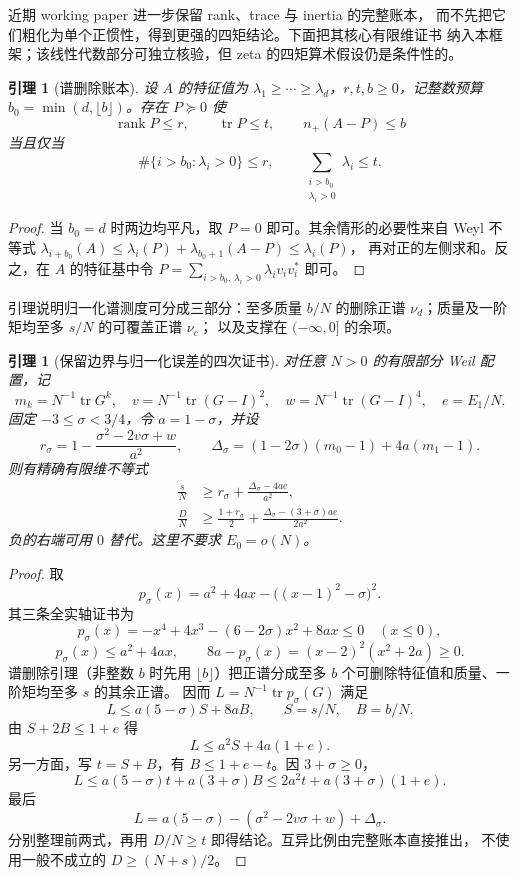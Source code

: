 \documentclass[UTF8,11pt,a4paper]{ctexart}
\newtheorem{lemma}[theorem]{引理}
\theoremstyle{definition}
\theoremstyle{remark}
\newcommand{\tr}{\operatorname{tr}}
\newcommand{\rank}{\operatorname{rank}}
\begin{document}
近期 working paper \cite{Notik26} 进一步保留 rank、trace 与 inertia 的完整账本，
而不先把它们粗化为单个正惯性，得到更强的四矩结论。下面把其核心有限维证书
纳入本框架；该线性代数部分可独立核验，但 zeta 的四矩算术假设仍是条件性的。

\begin{lemma}[谱删除账本]\label{lem:deletion}
设 $A$ 的特征值为 $\lambda_1\ge\cdots\ge\lambda_d$，$r,t,b\ge0$，记整数预算 $b_0=\min(d,\lfloor b\rfloor)$。存在
$P\succeq0$ 使
\[
 \rank P\le r,\qquad \tr P\le t,\qquad n_+(A-P)\le b
\]
当且仅当
\[
 \#\{i>b_0:\lambda_i>0\}\le r,\qquad
 \sum_{\substack{i>b_0\\\lambda_i>0}}\lambda_i\le t.
\]
\end{lemma}

\begin{proof}
当 $b_0=d$ 时两边均平凡，取 $P=0$ 即可。其余情形的必要性来自 Weyl 不等式
$\lambda_{i+b_0}(A)\le\lambda_i(P)+\lambda_{b_0+1}(A-P)\le\lambda_i(P)$，
再对正的左侧求和。反之，在 $A$ 的特征基中令
$P=\sum_{i>b_0,\,\lambda_i>0}\lambda_i v_iv_i^*$ 即可。
\end{proof}

引理说明归一化谱测度可分成三部分：至多质量 $b/N$ 的删除正谱
$\nu_d$；质量及一阶矩均至多 $s/N$ 的可覆盖正谱 $\nu_c$；
以及支撑在 $(-\infty,0]$ 的余项。

\begin{lemma}[保留边界与归一化误差的四次证书]\label{lem:quartic-finite}
对任意 $N>0$ 的有限部分 Weil 配置，记
\[
 m_k=N^{-1}\tr G^k,\quad
 v=N^{-1}\tr(G-I)^2,\quad w=N^{-1}\tr(G-I)^4,\quad
 e=E_1/N .
\]
固定 $-3\le\sigma<3/4$，令 $a=1-\sigma$，并设
\[
 r_\sigma=1-\frac{\sigma^2-2v\sigma+w}{a^2},\qquad
 \Delta_\sigma=(1-2\sigma)(m_0-1)+4a(m_1-1).
\]
则有精确有限维不等式
\begin{align}
 \frac{s}{N}&\ge r_\sigma+\frac{\Delta_\sigma-4ae}{a^2},
 \label{eq:quartic-finite-s}\\
 \frac{D}{N}&\ge\frac{1+r_\sigma}{2}
 +\frac{\Delta_\sigma-(3+\sigma)ae}{2a^2}.
 \label{eq:quartic-finite-d}
\end{align}
负的右端可用 $0$ 替代。这里不要求 $E_0=o(N)$。
\end{lemma}

\begin{proof}
取
\[
 p_\sigma(x)=a^2+4ax-\big((x-1)^2-\sigma\big)^2.
\]
其三条全实轴证书为
\[
 p_\sigma(x)=-x^4+4x^3-(6-2\sigma)x^2+8ax\le0
 \quad(x\le0),
\]
\[
 p_\sigma(x)\le a^2+4ax,\qquad
 8a-p_\sigma(x)=(x-2)^2(x^2+2a)\ge0.
\]
谱删除引理（非整数 $b$ 时先用 $\lfloor b\rfloor$）把正谱分成至多
$b$ 个可删除特征值和质量、一阶矩均至多 $s$ 的其余正谱。
因而 $L=N^{-1}\tr p_\sigma(G)$ 满足
\[
 L\le a(5-\sigma)S+8aB,\qquad S=s/N,\quad B=b/N.
\]
由 $S+2B\le1+e$ 得
\[
 L\le a^2S+4a(1+e).
\]
另一方面，写 $t=S+B$，有 $B\le1+e-t$。因 $3+\sigma\ge0$，
\[
 L\le a(5-\sigma)t+a(3+\sigma)B
 \le2a^2t+a(3+\sigma)(1+e).
\]
最后
\[
 L=a(5-\sigma)-(\sigma^2-2v\sigma+w)+\Delta_\sigma.
\]
分别整理前两式，再用 $D/N\ge t$ 即得结论。互异比例由完整账本直接推出，
不使用一般不成立的 $D\ge(N+s)/2$。
\end{proof}
\end{document}
